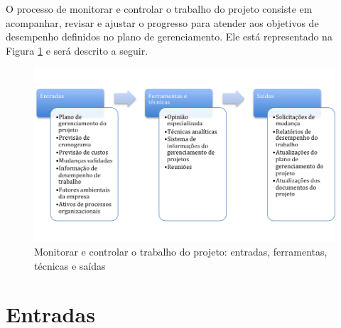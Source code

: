 O processo de monitorar e controlar o trabalho do projeto consiste em acompanhar, revisar e ajustar o progresso para atender aos objetivos de desempenho definidos no plano de gerenciamento. Ele está representado na Figura \ref{fig:mon:cont:trab:projeto:etfs} e será descrito a seguir.

\begin{figure}[!h]
	\centering
	\includegraphics[scale=0.75]{Figuras/mon_cont_trab_efts.png}
	\caption{Monitorar e controlar o trabalho do projeto: entradas, ferramentas, técnicas e saídas}
	\label{fig:mon:cont:trab:projeto:etfs}
\end{figure}

\section{Entradas}

